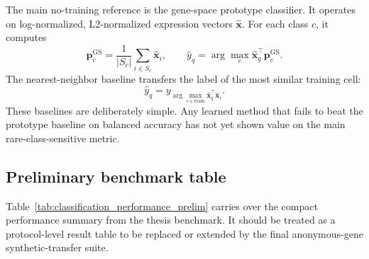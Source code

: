 \documentclass{article}
\begin{document}
The main no-training reference is the gene-space prototype classifier. It operates on log-normalized, L2-normalized expression vectors \(\hat{\mathbf{x}}\). For each class \(c\), it computes
\begin{equation}
    \mathbf{p}^{\mathrm{GS}}_c=\frac{1}{|S_c|}\sum_{i\in S_c}\hat{\mathbf{x}}_i,
    \qquad
    \hat{y}_q=\arg\max_c\hat{\mathbf{x}}_q^\top\mathbf{p}^{\mathrm{GS}}_c.
\end{equation}
The nearest-neighbor baseline transfers the label of the most similar training cell:
\begin{equation}
    \hat{y}_q=y_{\arg\max_{i\in\mathrm{train}}\hat{\mathbf{x}}_q^\top\hat{\mathbf{x}}_i}.
\end{equation}
These baselines are deliberately simple. Any learned method that fails to beat the prototype baseline on balanced accuracy has not yet shown value on the main rare-class-sensitive metric.

\subsection{Preliminary benchmark table}

Table~\ref{tab:classification_performance_prelim} carries over the compact performance summary from the thesis benchmark. It should be treated as a protocol-level result table to be replaced or extended by the final anonymous-gene synthetic-transfer suite.
\end{document}
